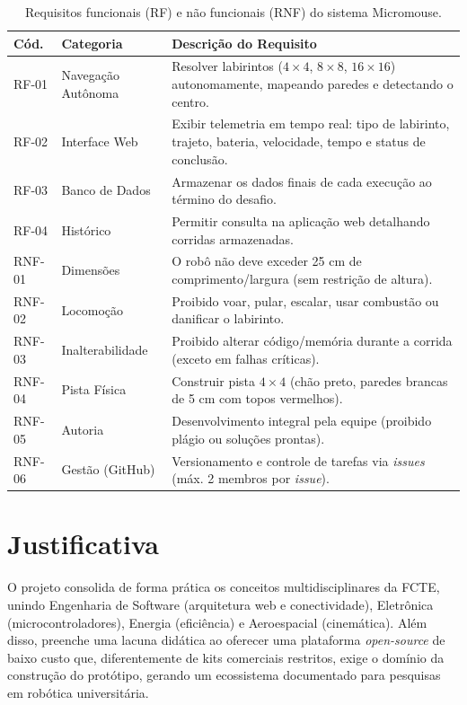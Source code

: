\begin{table}[H] 
    \centering
    \small
    \caption{Requisitos funcionais (RF) e não funcionais (RNF) do sistema Micromouse.}
    \label{tab:requisitos_micromouse}
    \renewcommand{\arraystretch}{1.3}
    \begin{tabularx}{\linewidth}{|l|l|X|}
        \hline
        \textbf{Cód.} & \textbf{Categoria} & \textbf{Descrição do Requisito} \\ \hline
        RF-01 & Navegação Autônoma & Resolver labirintos ($4\times4$, $8\times8$, $16\times16$) autonomamente, mapeando paredes e detectando o centro. \\ \hline
        RF-02 & Interface Web & Exibir telemetria em tempo real: tipo de labirinto, trajeto, bateria, velocidade, tempo e status de conclusão. \\ \hline
        RF-03 & Banco de Dados & Armazenar os dados finais de cada execução ao término do desafio. \\ \hline
        RF-04 & Histórico & Permitir consulta na aplicação web detalhando corridas armazenadas. \\ \hline
        RNF-01 & Dimensões & O robô não deve exceder 25 cm de comprimento/largura (sem restrição de altura). \\ \hline
        RNF-02 & Locomoção & Proibido voar, pular, escalar, usar combustão ou danificar o labirinto. \\ \hline
        RNF-03 & Inalterabilidade & Proibido alterar código/memória durante a corrida (exceto em falhas críticas). \\ \hline
        RNF-04 & Pista Física & Construir pista $4\times4$ (chão preto, paredes brancas de 5 cm com topos vermelhos). \\ \hline
        RNF-05 & Autoria & Desenvolvimento integral pela equipe (proibido plágio ou soluções prontas). \\ \hline
        RNF-06 & Gestão (GitHub) & Versionamento e controle de tarefas via \textit{issues} (máx. 2 membros por \textit{issue}). \\ \hline
    \end{tabularx}
\end{table}

\section{Justificativa}
O projeto consolida de forma prática os conceitos multidisciplinares da FCTE, unindo Engenharia de Software (arquitetura web e conectividade), Eletrônica (microcontroladores), Energia (eficiência) e Aeroespacial (cinemática). Além disso, preenche uma lacuna didática ao oferecer uma plataforma \textit{open-source} de baixo custo que, diferentemente de kits comerciais restritos, exige o domínio da construção do protótipo, gerando um ecossistema documentado para pesquisas em robótica universitária.

